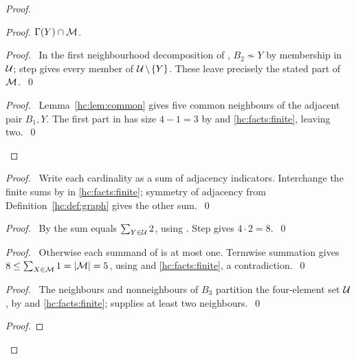 \begin{mergedproofsection}
\begin{proof}
\begin{proof}
{   $\Gamma(Y)\cap{\mathcal M}$.}
  \begin{proof}\pf\ In the first neighbourhood decomposition of
   , $B_2\not\sim Y$ by membership in
   ${\mathcal U}$; step  gives every member of
   ${\mathcal U}\mathbin{\mkern-1.5mu\setminus\mkern-1.5mu}\{Y\}$. These leave precisely the stated part of ${\mathcal M}$.~\qed\end{proof}
  \qedstep
  \begin{proof}\pf\ Lemma~\ref{hc:lem:common} gives five common
   neighbours of the adjacent pair $B_1,Y$. The first part in
    has size $4-1=3$ by
    and \ref{hc:facts:finite}, leaving two.~\qed\end{proof}
 \end{proof}
 \begin{proof}\pf\ Write each cardinality as a sum of adjacency
  indicators. Interchange the finite sums by 
  in \ref{hc:facts:finite}; symmetry of adjacency from
  Definition~\ref{hc:def:graph} gives the other sum.~\qed\end{proof}
 \begin{proof}\pf\ By  the sum equals
  $\sum_{Y\in{\mathcal U}}2$, using .
  Step  gives $4\cdot2=8$.~\qed\end{proof}
 \begin{proof}\pf\ Otherwise each summand of 
  is at most one. Termwise summation gives
  $8\le\sum_{X\in{\mathcal M}}1=|{\mathcal M}|=5$, using
   and \ref{hc:facts:finite}, a contradiction.~\qed\end{proof}
 \begin{proof}\pf\ The neighbours and nonneighbours of $B_3$ partition
  the four-element set ${\mathcal U}$, by  and
  \ref{hc:facts:finite};  supplies at least two neighbours.~\qed\end{proof}
 \begin{proof}

\end{proof}
\end{proof}
\end{mergedproofsection}
